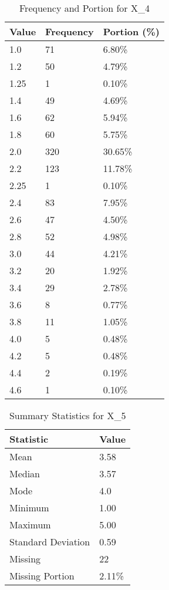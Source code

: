 \begin{table}[H]
\centering
\begin{tabular}{|l|l|l|}
\hline
\textbf{Value} & \textbf{Frequency} & \textbf{Portion (\%)} \\ \hline
1.0 & 71 & 6.80\% \\ \hline
1.2 & 50 & 4.79\% \\ \hline
1.25 & 1 & 0.10\% \\ \hline
1.4 & 49 & 4.69\% \\ \hline
1.6 & 62 & 5.94\% \\ \hline
1.8 & 60 & 5.75\% \\ \hline
2.0 & 320 & 30.65\% \\ \hline
2.2 & 123 & 11.78\% \\ \hline
2.25 & 1 & 0.10\% \\ \hline
2.4 & 83 & 7.95\% \\ \hline
2.6 & 47 & 4.50\% \\ \hline
2.8 & 52 & 4.98\% \\ \hline
3.0 & 44 & 4.21\% \\ \hline
3.2 & 20 & 1.92\% \\ \hline
3.4 & 29 & 2.78\% \\ \hline
3.6 & 8 & 0.77\% \\ \hline
3.8 & 11 & 1.05\% \\ \hline
4.0 & 5 & 0.48\% \\ \hline
4.2 & 5 & 0.48\% \\ \hline
4.4 & 2 & 0.19\% \\ \hline
4.6 & 1 & 0.10\% \\ \hline
\end{tabular}
\caption{Frequency and Portion for X_4}
\end{table}

\begin{table}[H]
\centering
\begin{tabular}{|l|l|}
\hline
\textbf{Statistic} & \textbf{Value} \\ \hline
Mean               & 3.58 \\ \hline
Median             & 3.57 \\ \hline
Mode               & 4.0 \\ \hline
Minimum            & 1.00 \\ \hline
Maximum            & 5.00 \\ \hline
Standard Deviation & 0.59 \\ \hline
Missing            & 22 \\ \hline
Missing Portion    & 2.11\% \\ \hline
\end{tabular}
\caption{Summary Statistics for X_5}
\end{table}

